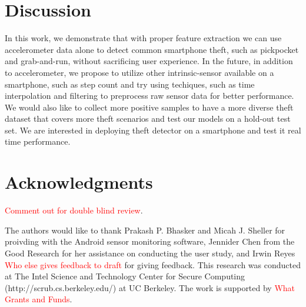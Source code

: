 \documentclass{soups}
\begin{document}
\section{Discussion}
In this work, we demonstrate that with proper feature extraction we can use accelerometer data alone to detect common smartphone theft, such as pickpocket and grab-and-run, without sacrificing user experience. In the future, in addition to accelerometer, we propose to utilize other intrinsic-sensor available on a smartphone, such as step count and try using techiques, such as time interpolation and filtering to preprocess raw sensor data for better performance. We would also like to collect more positive samples to have a more diverse theft dataset that covers more theft scenarios and test our models on a hold-out test set. We are interested in deploying theft detector on a smartphone and test it real time performance.




\section{Acknowledgments}
\textcolor{red}{Comment out for double blind review}. 

The authors would like to thank Prakash P. Bhasker and Micah J. Sheller for proivding with the Android sensor monitoring software, Jennider Chen from the Good Research for her assistance on conducting the user study, and Irwin Reyes \textcolor{red}{Who else gives feedback to draft} for giving feedback. This research was conducted at The Intel Science and Technology Center for Secure Computing (http://scrub.cs.berkeley.edu/) at UC Berkeley. The work is supported by \textcolor{red}{What Grants and Funds}. 




%
\end{document}
